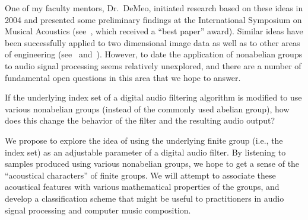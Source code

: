 \documentclass[10pt]{article}
\begin{document}
One of my faculty mentors, Dr.~DeMeo, initiated research based on these ideas in
2004 and presented some preliminary findings at the International Symposium on Musical
Acoustics (see~\cite{nonabeliandsp}, which received a ``best paper'' award).
Similar ideas have been successfully applied to two dimensional image data
as well as to other areas of engineering (see~\cite{Chirikjian:2002}
and~\cite{Tolimieri:2003}).  However, to date the application of 
nonabelian groups to audio signal processing seems relatively unexplored, and
there are a number of fundamental open questions in this area that we hope to
answer.  
 
\vskip5mm

If the underlying index set of a digital audio filtering algorithm is modified
to use various nonabelian groups (instead of the commonly used abelian group),
how does this change the behavior of the filter and the resulting audio output?

\vskip5mm

We propose to explore the idea of using the underlying finite group (i.e., the
index set) as an adjustable parameter of a digital audio filter.  By listening to
samples produced using various nonabelian groups, we hope to get a sense of the
``acoustical characters'' of finite groups.  We will attempt to associate these
acoustical features with various mathematical properties of the groups, and
develop a classification scheme that might be useful to
practitioners in audio signal processing and computer music composition.
\end{document}
